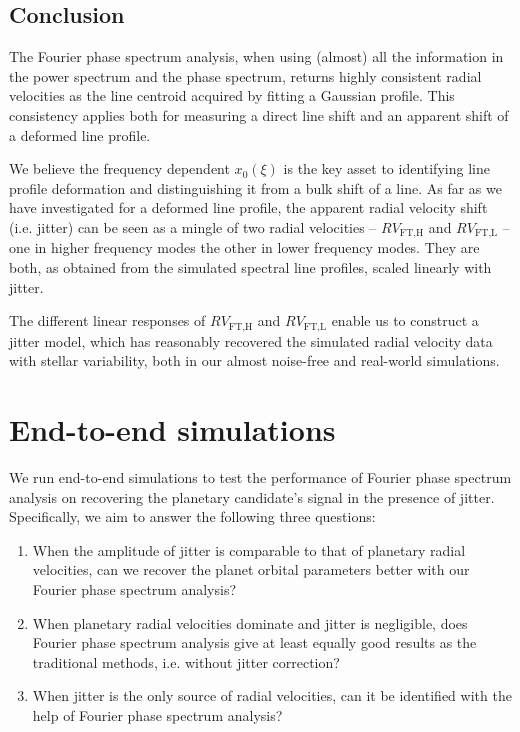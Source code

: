 \subsection{Conclusion}

The Fourier phase spectrum analysis, when using (almost) all the information in the power spectrum and the phase spectrum, returns highly consistent radial velocities as the line centroid acquired by fitting a Gaussian profile. This consistency applies both for measuring a direct line shift and an apparent shift of a deformed line profile. 

We believe the frequency dependent $x_0(\xi)$ is the key asset to identifying line profile deformation and distinguishing it from a bulk shift of a line. As far as we have investigated for a deformed line profile, the apparent radial velocity shift (i.e. jitter) can be seen as a mingle of two radial velocities -- $RV_\text{FT,H}$ and $RV_\text{FT,L}$ -- one in higher frequency modes the other in lower frequency modes. They are both, as obtained from the simulated spectral line profiles, scaled linearly with jitter. 

The different linear responses of $RV_\text{FT,H}$ and $RV_\text{FT,L}$ enable us to construct a jitter model, which has reasonably recovered the simulated radial velocity data with stellar variability, both in our almost noise-free and real-world simulations. 

\pagebreak
\section{End-to-end simulations}
\label{\thesection}
\label{sec:end-to-end}

We run end-to-end simulations to test the performance of Fourier phase spectrum analysis on recovering the planetary candidate's signal in the presence of jitter. Specifically, we aim to answer the following three questions:
\begin{enumerate}
	\item When the amplitude of jitter is comparable to that of planetary radial velocities, can we recover the planet orbital parameters better with our Fourier phase spectrum analysis? 
	\item When planetary radial velocities dominate and jitter is negligible, does Fourier phase spectrum analysis give at least equally good results as the traditional methods, i.e. without jitter correction? 
	\item When jitter is the only source of radial velocities, can it be identified with the help of Fourier phase spectrum analysis?
\end{enumerate}

